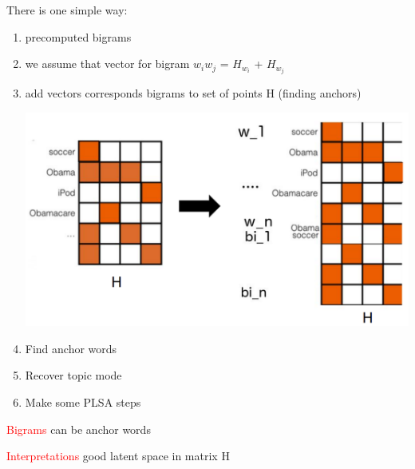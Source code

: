 \documentclass{beamer}
\begin{document}
\begin{frame}
	There is one simple way:
		\begin{enumerate}
			\item precomputed bigrams
			\item we assume that  vector for bigram $w_iw_j$ = $H_{w_i}$ + $H_{w_j}$
			\item add vectors corresponds bigrams to set of points H (finding anchors)
			\begin{center}
					\includegraphics[scale=0.2]{img/h}
			\end{center}
			
			\vspace{-0.5cm}
			\item Find anchor words
			\item Recover topic mode
			\item Make some PLSA steps
		\end{enumerate}
		
		\vspace{0.1cm}
		\textcolor{red}{Bigrams} can be anchor words
		
		\textcolor{red}{Interpretations} good latent space in matrix H
		
\end{frame}
\end{document}
